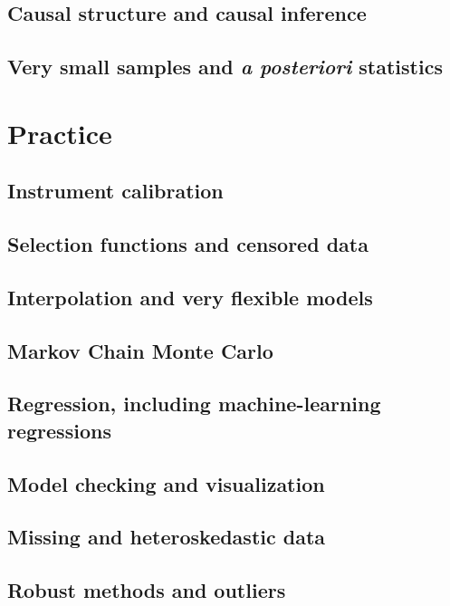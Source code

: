 \documentclass[10pt]{book}
\newcommand{\foreign}[1]{{\slshape #1}}
\begin{document}
\chapter{Causal structure and causal inference}

\chapter{Very small samples and \foreign{a posteriori} statistics}

\part{Practice}

\chapter{Instrument calibration}

\chapter{Selection functions and censored data}

\chapter{Interpolation and very flexible models}\label{ch:flexible}

\chapter{Markov Chain Monte Carlo}

\chapter{Regression, including machine-learning regressions}

\chapter{Model checking and visualization}

\chapter{Missing and heteroskedastic data}

\chapter{Robust methods and outliers}
\end{document}
